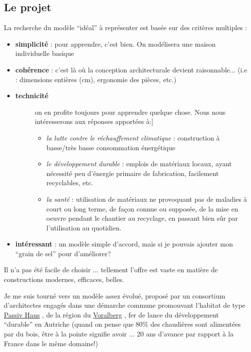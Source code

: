 \documentclass[a4paper,12pt,french]{sphinxmanual}
\begin{document}
\subsection{Le projet}
\label{init_su+acad/intro:le-projet}
La recherche du modèle ``idéal'' à représenter est basée sur des critères multiples :
\begin{itemize}
\item {} 
\textbf{simplicité} : pour apprendre, c'est bien. On modélisera une maison individuelle basique

\item {} 
\textbf{cohérence} : c'est là où la conception architecturale devient raisonnable... (i.e : dimensions entières (cm), ergonomie des pièces, etc.)

\item {} \begin{description}
\item[{\textbf{technicité}}] \leavevmode{[}on en profite toujours pour apprendre quelque chose. Nous nous intéresserons aux réponses apportées à:{]}\begin{itemize}
\item {} 
\emph{la lutte contre le réchauffement climatique} : construction à basse/très basse consommation énergétique

\item {} 
\emph{le développement durable} : emplois de matériaux locaux, ayant nécessité peu d'énergie primaire de fabrication, facilement recyclables, etc.

\item {} 
\emph{la santé} : utilisation de matériaux ne provoquant pas de maladies à court ou long terme, de façon connue ou supposée, de la mise en oeuvre pendant le chantier au recyclage, en passant bien sûr par l'utilisation au quotidien.

\end{itemize}

\end{description}

\item {} 
\textbf{intéressant} : un modèle simple d'accord, mais si je pouvais ajouter mon ``grain de sel'' pour d'améliorer?

\end{itemize}

Il n'a pas été facile de choisir ... tellement l'offre est vaste en matière de constructions modernes, efficaces, belles.

Je me suis tourné vers un modèle assez évolué, proposé par un consortium d'architectes engagés dans une démarche commune promouvant l'habitat de type \href{http://fr.ekopedia.org/PassivHaus}{Passiv Haus} , de la région du \href{http://fr.wikipedia.org/wiki/Voralberg}{Voralberg} , fer de lance du développement ``durable'' en Autriche (quand on pense que 80\% des chaudières sont alimentées par du bois, être à la pointe signifie avoir ... 20 ans d'avance par rapport à la France dans le même domaine!)
\end{document}

